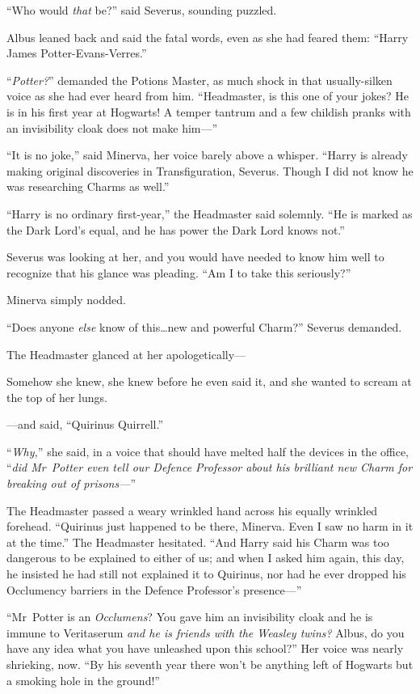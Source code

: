 “Who would \emph{that} be?” said Severus, sounding puzzled.

Albus leaned back and said the fatal words, even as she had feared them: “Harry James Potter-Evans-Verres.”

“\emph{Potter?}” demanded the Potions Master, as much shock in that usually-silken voice as she had ever heard from him. “Headmaster, is this one of your jokes? He is in his first year at Hogwarts! A temper tantrum and a few childish pranks with an invisibility cloak does not make him—”

“It is no joke,” said Minerva, her voice barely above a whisper. “Harry is already making original discoveries in Transfiguration, Severus. Though I did not know he was researching Charms as well.”

“Harry is no ordinary first-year,” the Headmaster said solemnly. “He is marked as the Dark Lord’s equal, and he has power the Dark Lord knows not.”

Severus was looking at her, and you would have needed to know him well to recognize that his glance was pleading. “Am I to take this seriously?”

Minerva simply nodded.

“Does anyone \emph{else} know of this…new and powerful Charm?” Severus demanded.

The Headmaster glanced at her apologetically—

Somehow she knew, she knew before he even said it, and she wanted to scream at the top of her lungs.

—and said, “Quirinus Quirrell.”

“\emph{Why,}” she said, in a voice that should have melted half the devices in the office, “\emph{did Mr~Potter even \emph{tell} our Defence Professor about his brilliant new Charm for breaking out of prisons—}”

The Headmaster passed a weary wrinkled hand across his equally wrinkled forehead. “Quirinus just happened to be there, Minerva. Even I saw no harm in it at the time.” The Headmaster hesitated. “And Harry said his Charm was too dangerous to be explained to either of us; and when I asked him again, this day, he insisted he had still not explained it to Quirinus, nor had he ever dropped his Occlumency barriers in the Defence Professor’s presence—”

“Mr~Potter is an \emph{Occlumens}? You gave him an invisibility cloak and he is immune to Veritaserum \emph{and he is friends with the Weasley twins?} Albus, do you have any idea what you have unleashed upon this school?” Her voice was nearly shrieking, now. “By his seventh year there won’t be anything left of Hogwarts but a smoking hole in the ground!”

